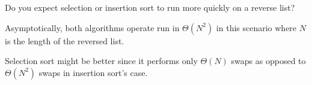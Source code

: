 \question Do you expect selection or insertion sort to run more quickly on a
reverse list?

\begin{solution}[0.5in]
Asymptotically, both algorithms operate run in $\Theta(N^2)$ in this scenario
where $N$ is the length of the reversed list.

Selection sort might be better since it performs only $\Theta(N)$ swaps as
opposed to $\Theta(N^2)$ swaps in insertion sort's case.
\end{solution}
